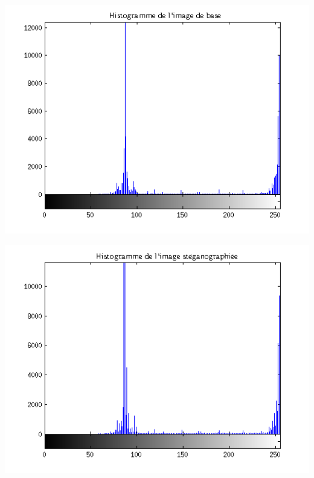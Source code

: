 \begin{minipage}{.5\textwidth}\centering
	\includegraphics[scale=0.4]{images/fig5.png}
	\label{fig5}
\end{minipage}
\begin{minipage}{.5\textwidth}\centering
	\includegraphics[scale=0.4]{images/fig6.png}
	\label{fig6}
\end{minipage}

